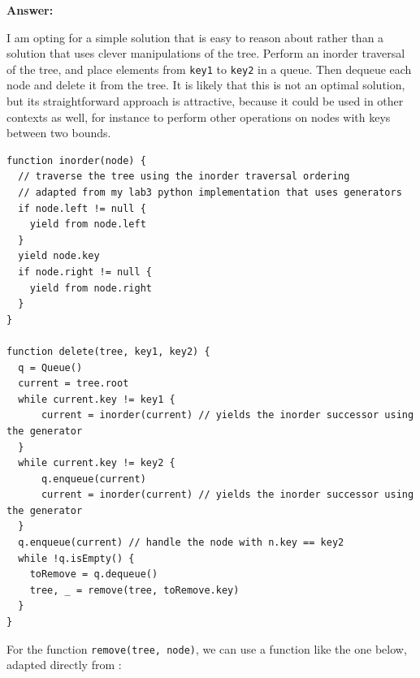 \documentclass[10pt,letterpaper,final]{report}
\begin{document}
\medskip
\noindent\textbf{Answer:}
\medskip

I am opting for a simple solution that is easy to reason about rather than a solution that uses clever manipulations of the tree. Perform an inorder traversal of the tree, and place elements from \texttt{key1} to \texttt{key2} in a queue. Then dequeue each node and delete it from the tree. It is likely that this is not an optimal solution, but its straightforward approach is attractive, because it could be used in other contexts as well, for instance to perform other operations on nodes with keys between two bounds.

\begin{verbatim}
function inorder(node) {
  // traverse the tree using the inorder traversal ordering
  // adapted from my lab3 python implementation that uses generators
  if node.left != null {
    yield from node.left
  }
  yield node.key
  if node.right != null {
    yield from node.right
  }
}

function delete(tree, key1, key2) {
  q = Queue()
  current = tree.root
  while current.key != key1 {
      current = inorder(current) // yields the inorder successor using the generator
  }
  while current.key != key2 {
      q.enqueue(current)
      current = inorder(current) // yields the inorder successor using the generator
  }
  q.enqueue(current) // handle the node with n.key == key2
  while !q.isEmpty() {
    toRemove = q.dequeue()
    tree, _ = remove(tree, toRemove.key)
  }
}
\end{verbatim}

For the function \texttt{remove(tree, node)}, we can use a function like the one below, adapted directly from \parencite{zybooks-ds2026}:
\end{document}
